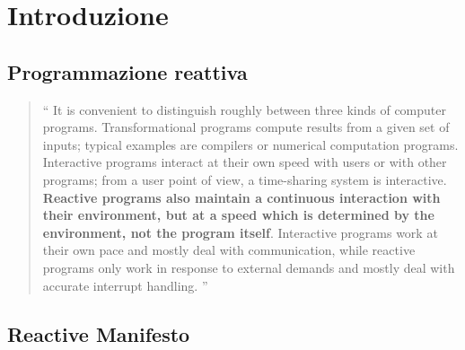     \begin{frame}[c]
        \titlepage
    \end{frame}

    \section{Introduzione}\label{sec:intro}
        \subsection{Programmazione reattiva}\label{subsec:react}
        \begin{frame}{\insertsectionhead}
            \begin{block}{\insertsubsectionhead}
                \smallskip
                \begin{quote}
                    `` It is convenient to distinguish roughly between three kinds of computer programs.
                    Transformational programs compute results from a given set of inputs;
                    typical examples are compilers or numerical computation programs.
                    Interactive programs interact at their own speed with users or with other programs;
                    from a user point of view, a time-sharing system is interactive.
                    \textbf{Reactive programs also maintain a continuous interaction with their environment, but at a speed which is determined by the environment, not the program itself}.
                    Interactive programs work at their own pace and mostly deal with communication, while reactive programs only work in response to external demands and mostly deal with accurate interrupt handling. ''
                \end{quote}
            \end{block}
        \end{frame}

        \subsection{Reactive Manifesto}\label{subsec:manifest}
        \begin{frame}{\insertsectionhead}
            \begin{block}{\insertsubsectionhead~\footnotemark}

            \end{block}
        \end{frame}

